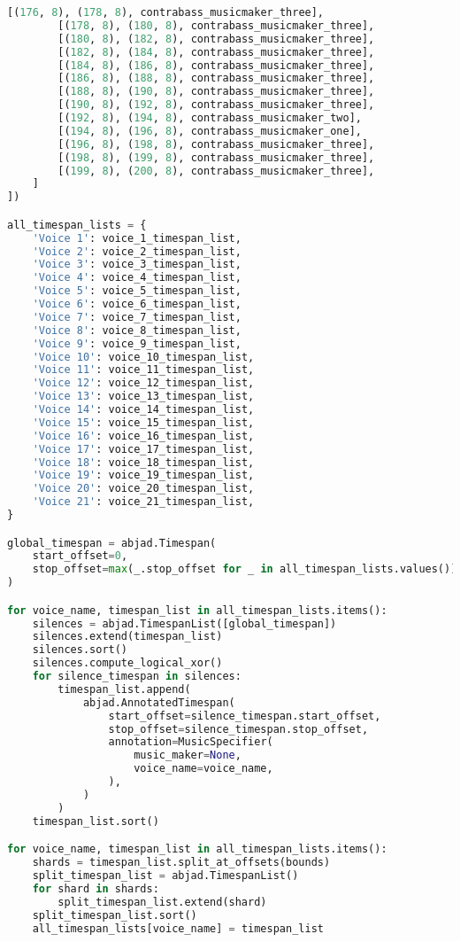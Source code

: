 \begin{lstlisting}[language=Python, caption=Invocation Source Code]
        [(176, 8), (178, 8), contrabass_musicmaker_three],
        [(178, 8), (180, 8), contrabass_musicmaker_three],
        [(180, 8), (182, 8), contrabass_musicmaker_three],
        [(182, 8), (184, 8), contrabass_musicmaker_three],
        [(184, 8), (186, 8), contrabass_musicmaker_three],
        [(186, 8), (188, 8), contrabass_musicmaker_three],
        [(188, 8), (190, 8), contrabass_musicmaker_three],
        [(190, 8), (192, 8), contrabass_musicmaker_three],
        [(192, 8), (194, 8), contrabass_musicmaker_two],
        [(194, 8), (196, 8), contrabass_musicmaker_one],
        [(196, 8), (198, 8), contrabass_musicmaker_three],
        [(198, 8), (199, 8), contrabass_musicmaker_three],
        [(199, 8), (200, 8), contrabass_musicmaker_three],
    ]
])

all_timespan_lists = {
    'Voice 1': voice_1_timespan_list,
    'Voice 2': voice_2_timespan_list,
    'Voice 3': voice_3_timespan_list,
    'Voice 4': voice_4_timespan_list,
    'Voice 5': voice_5_timespan_list,
    'Voice 6': voice_6_timespan_list,
    'Voice 7': voice_7_timespan_list,
    'Voice 8': voice_8_timespan_list,
    'Voice 9': voice_9_timespan_list,
    'Voice 10': voice_10_timespan_list,
    'Voice 11': voice_11_timespan_list,
    'Voice 12': voice_12_timespan_list,
    'Voice 13': voice_13_timespan_list,
    'Voice 14': voice_14_timespan_list,
    'Voice 15': voice_15_timespan_list,
    'Voice 16': voice_16_timespan_list,
    'Voice 17': voice_17_timespan_list,
    'Voice 18': voice_18_timespan_list,
    'Voice 19': voice_19_timespan_list,
    'Voice 20': voice_20_timespan_list,
    'Voice 21': voice_21_timespan_list,
}

global_timespan = abjad.Timespan(
    start_offset=0,
    stop_offset=max(_.stop_offset for _ in all_timespan_lists.values())
)

for voice_name, timespan_list in all_timespan_lists.items():
    silences = abjad.TimespanList([global_timespan])
    silences.extend(timespan_list)
    silences.sort()
    silences.compute_logical_xor()
    for silence_timespan in silences:
        timespan_list.append(
            abjad.AnnotatedTimespan(
                start_offset=silence_timespan.start_offset,
                stop_offset=silence_timespan.stop_offset,
                annotation=MusicSpecifier(
                    music_maker=None,
                    voice_name=voice_name,
                ),
            )
        )
    timespan_list.sort()

for voice_name, timespan_list in all_timespan_lists.items():
    shards = timespan_list.split_at_offsets(bounds)
    split_timespan_list = abjad.TimespanList()
    for shard in shards:
        split_timespan_list.extend(shard)
    split_timespan_list.sort()
    all_timespan_lists[voice_name] = timespan_list


\end{lstlisting}
